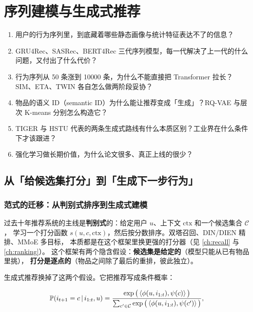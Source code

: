 \chapter{序列建模与生成式推荐}
\label{ch:sequence}

\begin{insight}[本章要解决的问题]
\begin{enumerate}
  \item 用户的行为序列里，到底藏着哪些静态画像与统计特征表达不了的信息？
  \item GRU4Rec、SASRec、BERT4Rec 三代序列模型，每一代解决了上一代的什么问题，又付出了什么代价？
  \item 行为序列从 50 条涨到 10000 条，为什么不能直接把 Transformer 拉长？SIM、ETA、TWIN 各自怎么做两阶段妥协？
  \item 物品的语义 ID（semantic ID）为什么能让推荐变成「生成」？RQ-VAE 与层次 K-means 分别怎么构造它？
  \item TIGER 与 HSTU 代表的两条生成式路线有什么本质区别？工业界在什么条件下才该跟进？
  \item 强化学习做长期价值，为什么论文很多、真正上线的很少？
\end{enumerate}
\end{insight}

\section{从「给候选集打分」到「生成下一步行为」}

\subsection{范式的迁移：从判别式排序到生成式建模}

过去十年推荐系统的主线是\textbf{判别式}的：给定用户 $u$、上下文 $\text{ctx}$ 和一个候选集合 $\mathcal{C}$，
学习一个打分函数 $s(u, c, \text{ctx})$，然后按分数排序。双塔召回、DIN/DIEN 精排、MMoE 多目标，
本质都是在这个框架里换更强的打分器（见 \cref{ch:recall} 与 \cref{ch:ranking}）。
这个框架有两个隐含假设：\textbf{候选集是给定的}（模型只能从已有物品里挑），
\textbf{打分是逐点的}（物品之间除了最后的重排，彼此独立）。

生成式推荐换掉了这两个假设。它把推荐写成条件概率：

\begin{equation}
\operatorname{\mathbb{P}}(i_{t+1} = c \,\vert\, i_{1:t}, u)
= \frac{\exp\big( \left\langle  \phi(u, i_{1:t}) ,  \psi(c)  \right\rangle \big)}
       {\sum_{c' \in \mathcal{C}} \exp\big( \left\langle  \phi(u, i_{1:t}) ,  \psi(c')  \right\rangle \big)} ,
\label{eq:next-item}
\end{equation}

